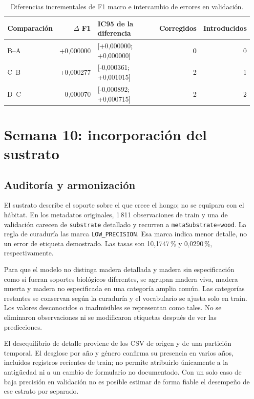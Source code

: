 \documentclass[11pt,a4paper]{article}
\begin{document}
\begin{table}[H]
\centering
\caption{Diferencias incrementales de F1 macro e intercambio de errores en validación.}
\label{tab:deltas}
\begin{tabular}{lrlrr}
\toprule
Comparación & $\Delta$ F1 & IC95 de la diferencia & Corregidos & Introducidos \\
\midrule
B--A & +0,000000 & [+0,000000; +0,000000] & 0 & 0 \\
C--B & +0,000277 & [-0,000361; +0,001015] & 2 & 1 \\
D--C & -0,000070 & [-0,000892; +0,000715] & 2 & 2 \\
\bottomrule
\end{tabular}
\par{}
\end{table}

\section{Semana 10: incorporación del sustrato}
\subsection{Auditoría y armonización}
El sustrato describe el soporte sobre el que crece el hongo; no se equipara
con el hábitat. En los metadatos originales, 1\,811 observaciones de train y
una de validación carecen de \texttt{substrate} detallado y recurren a
\texttt{metaSubstrate=wood}. La regla de curaduría las marca
\texttt{LOW\_PRECISION}. Esa marca indica menor detalle, no un error de
etiqueta demostrado. Las tasas son 10,1747\,\% y 0,0290\,\%, respectivamente.

Para que el modelo no distinga madera detallada y madera sin especificación
como si fueran soportes biológicos diferentes, se agrupan madera viva, madera
muerta y madera no especificada en una categoría amplia común. Las categorías
restantes se conservan según la curaduría y el vocabulario se ajusta solo en
train. Los valores desconocidos o inadmisibles se representan como tales.
No se eliminaron observaciones ni se modificaron etiquetas después de ver las
predicciones.

El desequilibrio de detalle proviene de los CSV de origen y de una partición
temporal. El desglose por año y género confirma su presencia en varios años,
incluidos registros recientes de train; no permite atribuirlo únicamente a la
antigüedad ni a un cambio de formulario no documentado. Con un solo caso de
baja precisión en validación no es posible estimar de forma fiable el desempeño
de ese estrato por separado.
\end{document}
